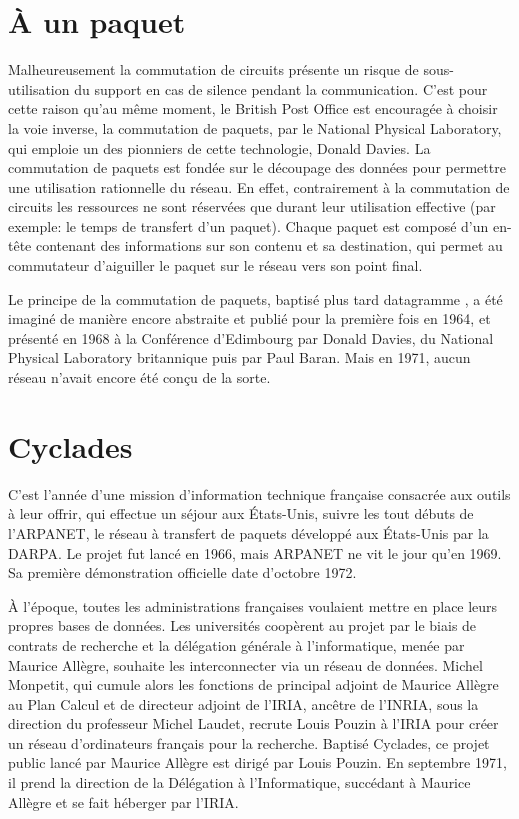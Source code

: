 \documentclass[12pt]{report}
\begin{document}
\section{À un paquet}

Malheureusement la commutation de circuits présente un risque de sous-utilisation du support en cas de \og silence \fg pendant la communication.
C'est pour cette raison qu'au même moment, le British Post Office est encouragée à choisir la voie inverse, la commutation de paquets, par le National Physical Laboratory, qui emploie un des pionniers de cette technologie, Donald Davies. La commutation de paquets est fondée sur le découpage des données pour permettre une utilisation rationnelle du réseau. En effet, contrairement à la commutation de circuits les ressources ne sont réservées que durant leur utilisation effective (par exemple: le temps de transfert d'un paquet). Chaque paquet est composé d'un en-tête contenant des informations sur son contenu et sa destination, qui permet au commutateur d'aiguiller le paquet sur le réseau vers son point final\cite{wikicp}.

Le principe de la commutation de paquets, baptisé plus tard \og datagramme \fg, a été imaginé de manière encore abstraite et publié pour la première fois en 1964, et présenté en 1968 à la Conférence d'Edimbourg par Donald Davies, du National Physical Laboratory britannique puis par Paul Baran. Mais en 1971, aucun réseau n'avait encore été conçu de la sorte.

\section{Cyclades}


C'est l'année d'une mission d’information technique française consacrée aux outils à leur offrir, qui effectue un séjour aux États-Unis, suivre les tout débuts de l'\gls{ARPANET}, le réseau à transfert de paquets développé aux États-Unis par la \gls{DARPA}. Le projet fut lancé en 1966, mais ARPANET ne vit le jour qu'en 1969. Sa première démonstration officielle date d'octobre 1972\cite{wikiarpa}.

À l'époque, toutes les administrations françaises voulaient mettre en place leurs propres bases de données. Les universités coopèrent au projet par le biais de contrats de recherche et la délégation générale à l'informatique, menée par Maurice Allègre, souhaite les interconnecter via un réseau de données. Michel Monpetit, qui cumule alors les fonctions de principal adjoint de Maurice Allègre au Plan Calcul et de directeur adjoint de l'IRIA, ancêtre de l'\gls{INRIA}, sous la direction du professeur Michel Laudet, recrute Louis Pouzin à l'IRIA pour créer un réseau d'ordinateurs français pour la recherche. Baptisé Cyclades, ce projet public lancé par Maurice Allègre est dirigé par Louis Pouzin. En septembre 1971, il prend la direction de la Délégation à l’Informatique, succédant à Maurice Allègre et se fait héberger par l’IRIA\cite{wikicyc}.
\end{document}
